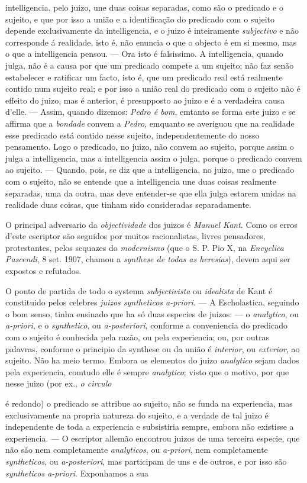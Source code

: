 intelligencia, pelo juizo, une duas coisas separadas, como são o predicado e o sujeito, e que por isso a união e a identificação do predicado com o sujeito depende exclusivamente da intelligencia, e o juizo é inteiramente \emph{subjectivo} e não corresponde á realidade, isto é, não enuncia o que o objecto é em si mesmo, mas o que a intelligencia pensou. --- Ora isto é falsissimo. A intelligencia, quando julga, não é a causa por que um predicado compete a um sujeito; não faz senão estabelecer e ratificar um facto, isto é, que um predicado real está realmente contido num sujeito real; e por isso a união real do predicado com o sujeito não é effeito do juizo, mas é anterior, é presupposto ao juizo e é a verdadeira causa d'elle. --- Assim, quando dizemos: \emph{Pedro é bom}, emtanto se forma este juizo e se affirma que a \emph{bondade} convem a \emph{Pedro}, emquanto se averiguou que na realidade esse predicado está contido nesse sujeito, independentemente do nosso pensamento. Logo o predicado, no juizo, não convem ao sujeito, porque assim o julga a intelligencia, mas a intelligencia assim o julga, porque o predicado convem ao sujeito. --- Quando, pois, se diz que a intelligencia, no juizo, une o predicado com o sujeito, não se entende que a intelligencia une duas coisas realmente separadas, uma da outra, mas deve entender-se que ella julga estarem unidas na realidade duas coisas, que tinham sido consideradas separadamente.\par O principal adversario da \emph{objectividade} dos juizos é \emph{Manuel Kant}. Como os erros d'este escriptor são seguidos por muitos racionalistas, livres pensadores, protestantes, pelos sequazes do \emph{modernismo} (que o S. P. Pio X, na \emph{Encyclica Pascendi}, 8 set. 1907, chamou a \emph{synthese de todas as heresias}), devem aqui ser expostos e refutados.\par O ponto de partida de todo o systema \emph{subjectivista} ou \emph{idealista} de Kant é constituido pelos celebres \emph{juizos syntheticos a-priori}. --- A Escholastica, seguindo o bom senso, tinha ensinado que ha só duas especies de juizos: --- o \emph{analytico}, ou \emph{a-priori}, e o \emph{synthetico}, ou \emph{a-posteriori}, conforme a conveniencia do predicado com o sujeito é conhecida pela razão, ou pela experiencia; ou, por outras palavras, conforme o principio da synthese ou da união é \emph{interior}, ou \emph{exterior}, ao sujeito. Não ha meio termo. Embora os elementos do juizo \emph{analytico} sejam dados pela experiencia, comtudo elle é sempre \emph{analytico}; visto que o motivo, por que nesse juizo (por ex., \emph{o circulo}\par é redondo) o predicado se attribue ao sujeito, não se funda na experiencia, mas exclusivamente na propria natureza do sujeito, e a verdade de tal juizo é independente de toda a experiencia e subsistiria sempre, embora não existisse a experiencia. --- O escriptor allemão encontrou juizos de uma terceira especie, que não são nem completamente \emph{analyticos}, ou \emph{a-priori}, nem completamente \emph{syntheticos}, ou \emph{a-posteriori}, mas participam de uns e de outros, e por isso são \emph{syntheticos a-priori}. Exponhamos a sua 